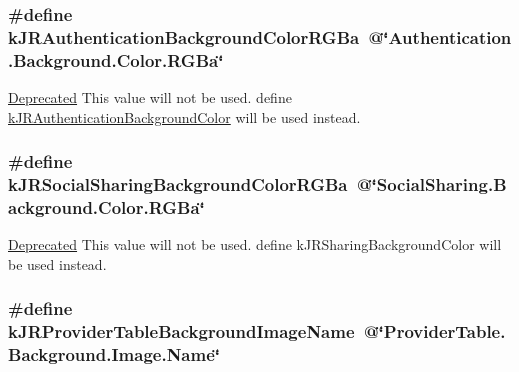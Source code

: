 \hypertarget{group__custom_interface_gae0c84a976949aa4eccecc123786efb3c}{
\subsubsection[{kJRAuthenticationBackgroundColorRGBa}]{\setlength{\rightskip}{0pt plus 5cm}\#define kJRAuthenticationBackgroundColorRGBa~@\char`\"{}Authentication.Background.Color.RGBa\char`\"{}}}
\label{group__custom_interface_gae0c84a976949aa4eccecc123786efb3c}
\begin{Desc}
\item[\hyperlink{deprecated__deprecated000004}{Deprecated}]This value will not be used. define \hyperlink{group__custom_interface_gacfe014997457d27386eff69eb731ce0f}{kJRAuthenticationBackgroundColor} will be used instead. \end{Desc}
\hypertarget{group__custom_interface_ga6554a101f0e2e9474a77262143dc528b}{
\subsubsection[{kJRSocialSharingBackgroundColorRGBa}]{\setlength{\rightskip}{0pt plus 5cm}\#define kJRSocialSharingBackgroundColorRGBa~@\char`\"{}SocialSharing.Background.Color.RGBa\char`\"{}}}
\label{group__custom_interface_ga6554a101f0e2e9474a77262143dc528b}
\begin{Desc}
\item[\hyperlink{deprecated__deprecated000005}{Deprecated}]This value will not be used. define kJRSharingBackgroundColor will be used instead. \end{Desc}
\hypertarget{group__custom_interface_ga893fb6e20be0c6658e81a6a5d5c121f0}{
\subsubsection[{kJRProviderTableBackgroundImageName}]{\setlength{\rightskip}{0pt plus 5cm}\#define kJRProviderTableBackgroundImageName~@\char`\"{}ProviderTable.Background.Image.Name\char`\"{}}}
